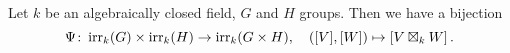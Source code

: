\begin{theorem}
  Let $k$ be an algebraically closed field, $G$ and $H$ groups.
  Then we have a bijection
  \[
            \Psi
    \colon  \operatorname{irr}_k(G) \times \operatorname{irr}_k(H)
    \to     \operatorname{irr}_k(G \times H),
    \quad   ([V],[W])
    \mapsto [V \boxtimes_k W] \,.
  \]
\end{theorem}
%   
